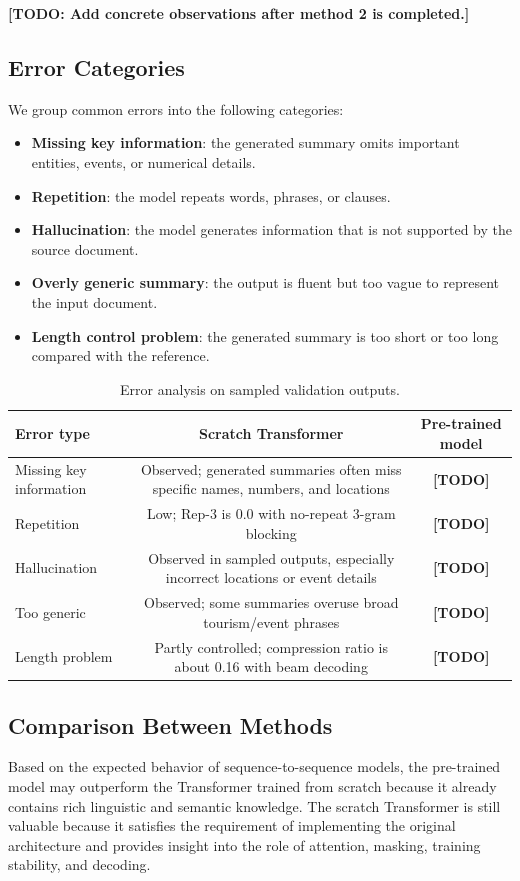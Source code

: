 \documentclass[conference]{IEEEtran}
\begin{document}
\textbf{[TODO: Add concrete observations after method 2 is completed.]}

\subsection{Error Categories}
We group common errors into the following categories:
\begin{itemize}
    \item \textbf{Missing key information}: the generated summary omits important entities, events, or numerical details.
    \item \textbf{Repetition}: the model repeats words, phrases, or clauses.
    \item \textbf{Hallucination}: the model generates information that is not supported by the source document.
    \item \textbf{Overly generic summary}: the output is fluent but too vague to represent the input document.
    \item \textbf{Length control problem}: the generated summary is too short or too long compared with the reference.
\end{itemize}

\begin{table}[htbp]
\centering
\caption{Error analysis on sampled validation outputs.}
\label{tab:error_analysis}
\begin{tabular}{lcc}
\toprule
Error type & Scratch Transformer & Pre-trained model \\
\midrule
Missing key information & Observed; generated summaries often miss specific names, numbers, and locations & \textbf{[TODO]} \\
Repetition & Low; Rep-3 is 0.0 with no-repeat 3-gram blocking & \textbf{[TODO]} \\
Hallucination & Observed in sampled outputs, especially incorrect locations or event details & \textbf{[TODO]} \\
Too generic & Observed; some summaries overuse broad tourism/event phrases & \textbf{[TODO]} \\
Length problem & Partly controlled; compression ratio is about 0.16 with beam decoding & \textbf{[TODO]} \\
\bottomrule
\end{tabular}
\end{table}

\subsection{Comparison Between Methods}
Based on the expected behavior of sequence-to-sequence models, the pre-trained model may outperform the Transformer trained from scratch because it already contains rich linguistic and semantic knowledge. The scratch Transformer is still valuable because it satisfies the requirement of implementing the original architecture and provides insight into the role of attention, masking, training stability, and decoding.
\end{document}
